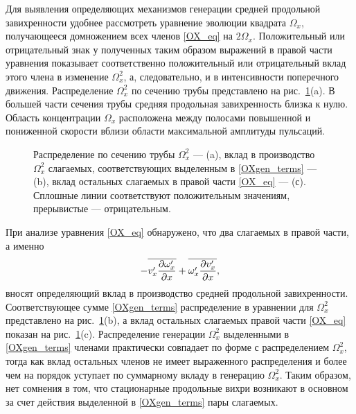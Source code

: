 Для выявления определяющих механизмов генерации средней продольной завихренности удобнее рассмотреть уравнение эволюции квадрата $\Omega_x$, получающееся домножением всех членов \eqref{OX_eq} на $2\Omega_x$. Положительный или отрицательный знак у полученных таким образом выражений в правой части уравнения показывает соответственно положительный или отрицательный вклад этого члена в изменение $\Omega_x^2$, а, следовательно, и в интенсивности поперечного движения. Распределение $\Omega_x^2$ по сечению трубы представлено на рис.~\ref{OXgen_pic}(a). В большей части сечения трубы средняя продольная завихренность близка к нулю. Область концентрации $\Omega_x$ расположена между полосами повышенной и пониженной скорости вблизи области максимальной амплитуды пульсаций.

\begin{figure}[h]
\caption{Распределение по сечению трубы $\Omega_x^2$ --- (a), вклад в производство $\Omega_x^2$ слагаемых, соответствующих выделенным в \eqref{OXgen_terms} --- (b), вклад остальных слагаемых в правой части \eqref{OX_eq} --- (с). Сплошные линии соответствуют положительным значениям, прерывистые --- отрицательным.}
\label{OXgen_pic}
\end{figure}

При анализе уравнения \eqref{OX_eq} обнаружено, что два слагаемых в правой части, а именно
\begin{equation}\label{OXgen_terms}
 - \overline{v'_x \frac{\partial \omega'_x}{\partial x}} + \overline{ \omega'_x \frac{\partial v'_x}{\partial x} },
\end{equation}
вносят определяющий вклад в производство средней продольной завихренности. Соответствующее сумме \eqref{OXgen_terms}  распределение в уравнении для $\Omega_x^2$ представлено на рис.~\ref{OXgen_pic}(b), а вклад остальных слагаемых правой части \eqref{OX_eq} показан на рис.~\ref{OXgen_pic}(c). Распределение генерации $\Omega_x^2$ выделенными в \eqref{OXgen_terms} членами практически совпадает по форме с распределением $\Omega_x^2$, тогда как вклад остальных членов не имеет выраженного распределения и более чем на порядок уступает по суммарному вкладу в генерацию $\Omega_x^2$. Таким образом, нет сомнения в том, что стационарные продольные вихри возникают в основном за счет действия выделенной в \eqref{OXgen_terms} пары слагаемых.

